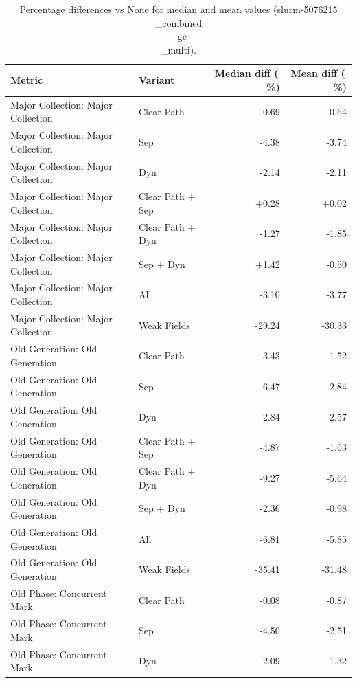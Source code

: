 \begin{table}[t]
\centering
\caption{Percentage differences vs None for median and mean values (slurm-5076215\\_combined\\_gc\\_multi).}
\label{tab:gc_metric_pct_diff_slurm-5076215\\_combined\\_gc\\_multi}
\begin{tabular}{llrr}
\toprule
Metric & Variant & Median diff (\,\%) & Mean diff (\,\%) \\
\midrule
Major Collection: Major Collection & Clear Path & -0.69 & -0.64 \\
Major Collection: Major Collection & Sep & -4.38 & -3.74 \\
Major Collection: Major Collection & Dyn & -2.14 & -2.11 \\
Major Collection: Major Collection & Clear Path + Sep & +0.28 & +0.02 \\
Major Collection: Major Collection & Clear Path + Dyn & -1.27 & -1.85 \\
Major Collection: Major Collection & Sep + Dyn & +1.42 & -0.50 \\
Major Collection: Major Collection & All & -3.10 & -3.77 \\
Major Collection: Major Collection & Weak Fields & -29.24 & -30.33 \\
Old Generation: Old Generation & Clear Path & -3.43 & -1.52 \\
Old Generation: Old Generation & Sep & -6.47 & -2.84 \\
Old Generation: Old Generation & Dyn & -2.84 & -2.57 \\
Old Generation: Old Generation & Clear Path + Sep & -4.87 & -1.63 \\
Old Generation: Old Generation & Clear Path + Dyn & -9.27 & -5.64 \\
Old Generation: Old Generation & Sep + Dyn & -2.36 & -0.98 \\
Old Generation: Old Generation & All & -6.81 & -5.85 \\
Old Generation: Old Generation & Weak Fields & -35.41 & -31.48 \\
Old Phase: Concurrent Mark & Clear Path & -0.08 & -0.87 \\
Old Phase: Concurrent Mark & Sep & -4.50 & -2.51 \\
Old Phase: Concurrent Mark & Dyn & -2.09 & -1.32 \\

\end{tabular}
\end{table}
